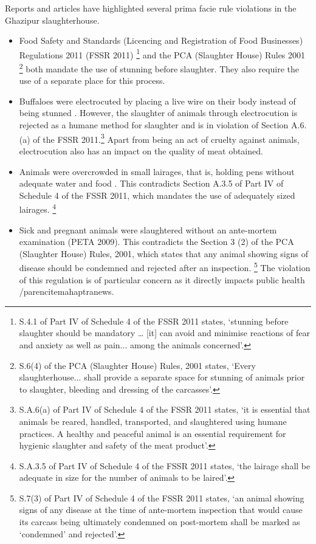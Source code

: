 \documentclass[a4paper, 12pt]{article}
\begin{document}
Reports and articles have highlighted several prima facie rule violations in the Ghazipur slaughterhouse. \\

\begin{itemize}
\item Food Safety and Standards (Licencing and Registration of Food Businesses) Regulations 2011 (FSSR 2011) \footnote{S.4.1 of Part IV of Schedule 4 of the FSSR 2011 states, ‘stunning before slaughter should be mandatory … [it] can avoid and minimise reactions of fear and anxiety as well as pain... among the animals concerned’.} and the PCA (Slaughter House) Rules 2001 \footnote{ S.6(4) of the PCA (Slaughter House) Rules, 2001 states, ‘Every slaughterhouse... shall provide a separate space for stunning of animals prior to slaughter, bleeding and dressing of the carcasses’.} both mandate the use of stunning before slaughter. They also require the use of a separate place for this process.
\item Buffaloes were electrocuted by placing a live wire on their body instead of being stunned \parencite{indiannews} \parencite{petareport}. However, the slaughter of animals through electrocution is rejected as a humane method for slaughter \parencite{chaudrypaper} and is in violation of Section A.6.(a) of the FSSR 2011.\footnote{ S.A.6(a) of Part IV of Schedule 4 of the FSSR 2011 states, ‘it is essential that animals be reared, handled, transported, and slaughtered using humane practices. A healthy and peaceful animal is an essential requirement for hygienic slaughter and safety of the meat product’.} Apart from being an act of cruelty against animals, electrocution also has an impact on the quality of meat obtained.
\item Animals were overcrowded in small lairages, that is, holding pens without adequate water and food \parencite{maanvinews}. This contradicts Section A.3.5 of Part IV of Schedule 4 of the FSSR 2011, which mandates the use of adequately sized lairages. \footnote{ S.A.3.5 of Part IV of Schedule 4 of the FSSR 2011 states, ‘the lairage shall be adequate in size for the number of animals to be laired’.}
\item Sick and pregnant animals were slaughtered without an ante-mortem examination (PETA 2009). This contradicts the Section 3 (2) of the PCA (Slaughter House) Rules, 2001, which states that any animal showing signs of disease should be condemned and rejected after an inspection. \footnote{ S.7(3) of Part IV of Schedule 4 of the FSSR 2011 states, ‘an animal showing signs of any disease at the time of ante-mortem inspection that would cause its carcass being ultimately condemned on post-mortem shall be marked as ‘condemned’ and rejected’.} The violation of this regulation is of particular concern as it directly impacts public health /parencite{mahaptranews}.

\end{itemize}
\end{document}
